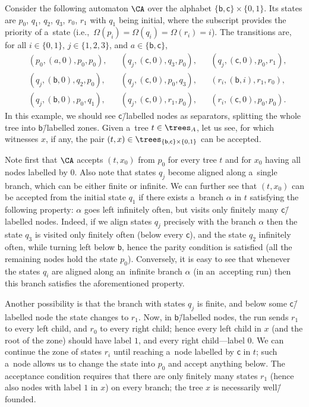 \begin{exa}\label{ex:automaton}
	Consider the following automaton $\CA$ over the alphabet $\{\mathsf{b},\mathsf{c}\}\times\{0,1\}$.
	Its states are $p_0$, $q_1$, $q_2$, $q_3$, $r_0$, $r_1$ with $q_1$ being initial, where the subscript provides the priority of a~state (i.e.,~$\Omega(p_i)=\Omega(q_i)=\Omega(r_i)=i$).
	The transitions are, for all $i\in\{0,1\}$, $j\in\{1,2,3\}$, and $a\in\{\mathsf{b},\mathsf{c}\}$,
	\begin{align*}
		&(p_0,(a,0),p_0,p_0),&		&(q_j,(\mathsf{c},0),q_3,p_0),&	&(q_j,(\mathsf{c},0),p_0,r_1),\\
		&(q_j,(\mathsf{b},0),q_2,p_0),&	&(q_j,(\mathsf{c},0),p_0,q_3),&	&(r_i,(\mathsf{b},i),r_1,r_0),\\
		&(q_j,(\mathsf{b},0),p_0,q_1),&	&(q_j,(\mathsf{c},0),r_1,p_0),&	&(r_i,(\mathsf{c},0),p_0,p_0).
	\end{align*}
	In this example, we should see $\mathsf{c}$\=/labelled nodes as separators, splitting the whole tree into $\mathsf{b}$\=/labelled zones.
	Given a~tree $t\in\trees_A$, let us see, for which witnesses $x$, if any, the pair $(t,x)\in\trees_{\{\mathsf{b},\mathsf{c}\}\times\{0,1\}}$ can be accepted.

	Note first that $\CA$ accepts $(t,x_0)$ from $p_0$ for every tree $t$ and for $x_0$ having all nodes labelled by $0$.
	Also note that states $q_j$ become aligned along a~single branch, which can be either finite or infinite.
	We can further see that $(t,x_0)$ can be accepted from the initial state $q_1$ if there exists a~branch $\alpha$ in $t$ satisfying the following property:
	$\alpha$ goes left infinitely often, but visits only finitely many $\mathsf{c}$\=/labelled nodes.
	Indeed, if we align states $q_j$ precisely with the branch $\alpha$ then the state $q_3$ is visited only finitely often (below every $\mathsf{c}$),
	and the state $q_2$ infinitely often, while turning left below $\mathsf{b}$, hence the parity condition is satisfied
	(all the remaining nodes hold the state $p_0$).
	Conversely, it is easy to see that whenever the states $q_i$ are aligned along an~infinite branch $\alpha$ (in an~accepting run) then this branch satisfies the aforementioned property.

	Another possibility is that the branch with states $q_j$ is finite, and below some $\mathsf{c}$\=/labelled node the state changes to $r_1$.
	Now, in $\mathsf{b}$\=/labelled nodes, the run sends $r_1$ to every left child, and $r_0$ to every right child;
	hence every left child in $x$ (and the root of the zone) should have label $1$, and every right child---label $0$.
	We can continue the zone of states $r_i$ until reaching a~node labelled by $\mathsf{c}$ in $t$;
	such a~node allows us to change the state into $p_0$ and accept anything below.
	The acceptance condition requires that there are only finitely many states $r_1$ (hence also nodes with label $1$ in $x$) on every branch;
	the tree $x$ is necessarily well\=/founded.
	

\end{exa}

